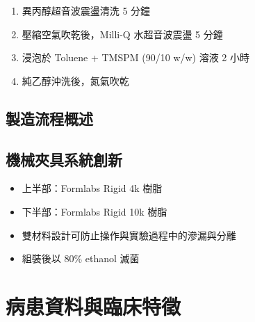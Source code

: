 \documentclass[12pt,a4paper]{article}
\begin{document}
\begin{enumerate}
    \item 異丙醇超音波震盪清洗 5 分鐘
    \item 壓縮空氣吹乾後，Milli-Q 水超音波震盪 5 分鐘
    \item 浸泡於 Toluene + TMSPM (90/10 w/w) 溶液 2 小時
    \item 純乙醇沖洗後，氮氣吹乾
\end{enumerate}

\subsection{製造流程概述}

\begin{center}
\end{center}

\subsection{機械夾具系統創新}

\begin{itemize}
    \item 上半部：Formlabs Rigid 4k 樹脂
    \item 下半部：Formlabs Rigid 10k 樹脂
    \item 雙材料設計可防止操作與實驗過程中的滲漏與分離
    \item 組裝後以 80\% ethanol 滅菌
\end{itemize}

\section{病患資料與臨床特徵}
\end{document}
